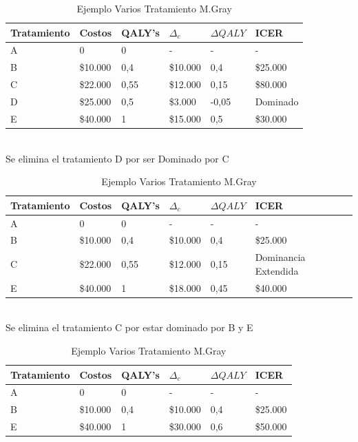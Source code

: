\documentclass[12pt]{article}
\begin{document}
\begin{table}[H]
\begin{tabularx}{\textwidth}{llllll}
  \hline
Tratamiento & Costos & QALY's & $\Delta_c$ & $\Delta{QALY}$ & ICER\\ 
  \hline
A & 0 & 0 & - & - & -\\ 
B & \$10.000 & 0,4 & \$10.000 & 0,4 & \$25.000 \\
C & \$22.000 & 0,55 & \$12.000 & 0,15 & \$80.000 \\
D & \$25.000 & 0,5 & \$3.000 & -0,05 & Dominado \\
E & \$40.000 & 1 & \$15.000 & 0,5 & \$30.000\\
 \hline
 \end{tabularx}\\
 Se elimina el tratamiento D por ser Dominado por C\\
 \centering
 \begin{tabularx}{\textwidth}{llllll}
 \hline
 Tratamiento & Costos & QALY's & $\Delta_c$ & $\Delta{QALY}$ & ICER\\ 
 \hline
A & 0 & 0 & - & - & -\\ 
B & \$10.000 & 0,4 & \$10.000 & 0,4 & \$25.000 \\
C & \$22.000 & 0,55 & \$12.000 & 0,15 & Dominancia Extendida \\
E & \$40.000 & 1 & \$18.000 & 0,45 & \$40.000\\
 \hline
\end{tabularx}\\

Se elimina el tratamiento C por estar dominado por B y E\\

\centering
\begin{tabularx}{\textwidth}{llllll}
\hline
 Tratamiento & Costos & QALY's & $\Delta_c$ & $\Delta{QALY}$ & ICER\\ 
 \hline
A & 0 & 0 & - & - & -\\ 
B & \$10.000 & 0,4 & \$10.000 & 0,4 & \$25.000 \\
E & \$40.000 & 1 & \$30.000 & 0,6 & \$50.000\\
\hline
\end{tabularx}

\caption{Ejemplo Varios Tratamiento M.Gray}
\label{tabla:2}
\end{table}
\end{document}
